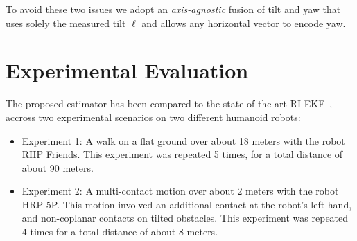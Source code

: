 \documentclass[10pt,twocolumn]{ICCAS}
\begin{document}
To avoid these two issues we adopt an \emph{axis-agnostic} fusion of tilt and yaw that
uses solely the measured tilt $\boldsymbol{\ell}$ and allows any horizontal
vector to encode yaw.

\section{Experimental Evaluation}

The proposed estimator has been compared to the state-of-the-art RI-EKF~\cite{Hartley2020RIEKF}, accross two experimental scenarios on two different humanoid robots:
\begin{itemize}
    \item Experiment 1: A walk on a flat ground over about 18 meters with the robot RHP Friends. This experiment was repeated 5 times, for a total distance of about 90 meters.
    \item Experiment 2: A multi-contact motion over about 2 meters with the robot HRP-5P. This motion involved an additional contact at the robot's left hand, and non-coplanar contacts on tilted obstacles. This experiment was repeated 4 times for a total distance of about 8 meters.
\end{itemize}
\end{document}
